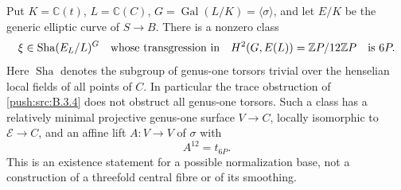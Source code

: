 \begin{proposition}\hypertarget{tag-030A}{}\label{push:src:B.3.6}\label{push:B36}

Put $K=\mathbb C(t)$, $L=\mathbb C(C)$,
$G=\operatorname{Gal}(L/K)=\langle\sigma\rangle$,
and let $E/K$ be the generic elliptic
curve of $S\to B$. There is a nonzero
class
\[
 \xi\in\operatorname{Sha}(E_L/L)^G
 \quad\hbox{whose transgression in}\quad
 H^2(G,E(L))=\mathbb ZP/12\mathbb ZP
 \quad\hbox{is }6P.
\]
Here $\operatorname{Sha}$ denotes the
subgroup of genus-one torsors trivial
over the henselian local fields of all
points of $C$.
In particular the trace obstruction of
\ref{push:src:B.3.4} does not obstruct all genus-one
torsors. Such a class has a relatively
minimal projective genus-one surface
$V\to C$, locally isomorphic to
$\mathscr E\to C$, and an affine lift
$A:V\to V$ of $\sigma$ with
\[
 A^{12}=t_{6P}.
\]
This is an existence statement for a
possible normalization base, not a
construction of a threefold central
fibre or of its smoothing.
\end{proposition}


